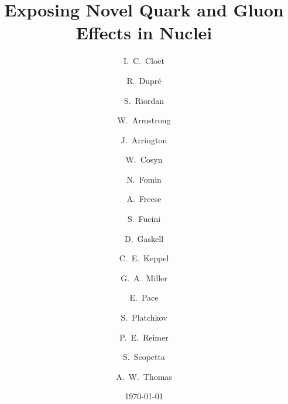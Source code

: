 \documentclass[10pt]{iopart}
\date{\today}
\begin{document}
\title{Exposing Novel Quark and Gluon Effects in Nuclei}

\author{I.~C.~Clo\"et}
\address{Physics Division, Argonne National Laboratory, Lemont, IL 60439, USA}

\author{R.~Dupr\'{e}}
\address{Institut de Physique Nucl\'eaire, CNRS-IN2P3, Univ. Paris-Sud, Universit\'e Paris-Saclay, 91406 Orsay Cedex, France}

\author{S.~Riordan}
\address{Physics Division, Argonne National Laboratory, Lemont, IL 60439, USA}

\author{W.~Armstrong}
\address{Physics Division, Argonne National Laboratory, Lemont, IL 60439, USA}

\author{J.~Arrington}
\address{Physics Division, Argonne National Laboratory, Lemont, IL 60439, USA}

\author{W.~Cosyn}
\address{Department of Physics and Astronomy, Ghent University, Proeftuinstraat 86, B9000 Ghent, Belgium}

\author{N.~Fomin}
\address{University of Tennessee, Knoxville, TN 37996, USA}

\author{A.~Freese}
\address{Physics Division, Argonne National Laboratory, Lemont, IL 60439, USA}

\author{S.~Fucini}
\address{Perugia University and INFN, Perugia Section, via A. Pascoli snc I-06123 Perugia, Italy}

\author{D.~Gaskell}
\address{Thomas Jefferson National Accelerator Facility, Newport News, VA 23606, USA}

\author{C.~E.~Keppel}
\address{Thomas Jefferson National Accelerator Facility, Newport News, VA 23606, USA}

\author{G.~A.~Miller}
\address{Department of Physics, University of Washington, Seattle, WA 98195-1560}

\author{E.~Pace}
\address{Universit\`a di Roma ``Tor Vergata'' and INFN, Sezione di  Roma Tor Vergata, 00133 Rome, Italy}

\author{S.~Platchkov}
\address{IRFU, CEA, Université Paris-Saclay, 91191 Gif-sur-Yvette, France}

\author{P.~E.~Reimer}
\address{Physics Division, Argonne National Laboratory, Lemont, IL 60439, USA}

\author{S.~Scopetta}
\address{Università di Perugia and INFN, Sezione di Perugia, via A. Pascoli snc I-06123 Perugia, Italy}

\author{A.~W.~Thomas}
\address{ARC Centre of Excellence for Particle Physics at the Terascale and CSSM, Department of Physics,
University of Adelaide, Adelaide SA 5005, Australia}
\end{document}
